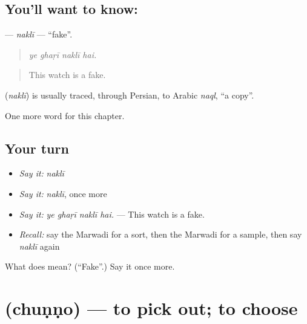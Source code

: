 \subsection*{You'll want to know: }
\textbf{} — \emph{naklī} — \textquotedblleft{}fake\textquotedblright{}.

\begin{quote}
   
\end{quote}

\begin{quote}
\emph{ye ghaṛī naklī hai.}
\end{quote}

\begin{quote}
This watch is a fake.
\end{quote}

\begin{cousinweb}
\textbf{} (\emph{naklī}) is usually traced, through Persian, to Arabic \emph{naql}, \textquotedblleft{}a copy\textquotedblright{}.
\end{cousinweb}

\begin{grammarlens}[title={What you've built}]
One more word for this chapter.
\end{grammarlens}

\subsection*{Your turn}
\begin{itemize}
\raggedright
  \item \emph{Say it:} \emph{naklī}
  \item \emph{Say it:} \emph{naklī}, once more
  \item \emph{Say it:} \emph{ye ghaṛī naklī hai.} — This watch is a fake.
  \item \emph{Recall:} say the Marwadi for a sort, then the Marwadi for a sample, then say \emph{naklī} again
\end{itemize}

\begin{tcolorbox}[breakable,colback=teal!4,colframe=teal!35!black,title={Before you move on}]
What does  mean? (\textquotedblleft{}Fake\textquotedblright{}.) Say it once more.
\end{tcolorbox}
\section[\texorpdfstring{\mw{चुणणो} (chuṇṇo)}{चुणणो (chuṇṇo)}]{ (chuṇṇo) — to pick out; to choose}

